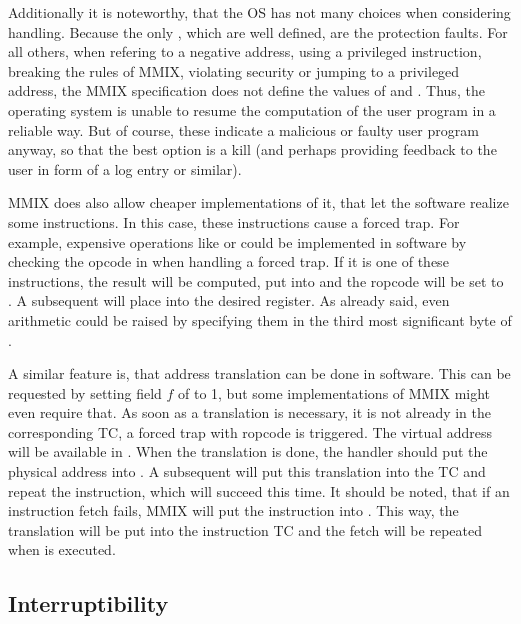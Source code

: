 Additionally it is noteworthy, that the OS has not many choices when considering  handling. Because the only , which are well defined, are the protection faults. For all others, \ie when refering to a negative address, using a privileged instruction, breaking the rules of MMIX, violating security or jumping to a privileged address, the MMIX specification does not define the values of  and . Thus, the operating system is unable to resume the computation of the user program in a reliable way. But of course, these  indicate a malicious or faulty user program anyway, so that the best option is a kill (and perhaps providing feedback to the user in form of a log entry or similar).

MMIX does also allow cheaper implementations of it, that let the software realize some instructions. In this case, these instructions cause a forced trap. For example, expensive operations like  or  could be implemented in software by checking the opcode in  when handling a forced trap. If it is one of these instructions, the result will be computed, put into  and the ropcode will be set to . A subsequent  will place  into the desired register. As already said, even arithmetic  could be raised by specifying them in the third most significant byte of . \citep[pg. 28]{mmix-doc}

A similar feature is, that address translation can be done in software. This can be requested by setting field $f$ of  to 1, but some implementations of MMIX might even require that. As soon as a translation is necessary, \ie it is not already in the corresponding TC, a forced trap with ropcode  is triggered. The virtual address will be available in . When the translation is done, the handler should put the physical address into . A subsequent  will put this translation into the TC and repeat the instruction, which will succeed this time. It should be noted, that if an instruction fetch fails, MMIX will put the instruction  into . This way, the translation will be put into the instruction TC and the fetch will be repeated when  is executed. \citep[pg. 28]{mmix-doc}

\subsection{Interruptibility}
\label{sec:mmix-interruptibility}

